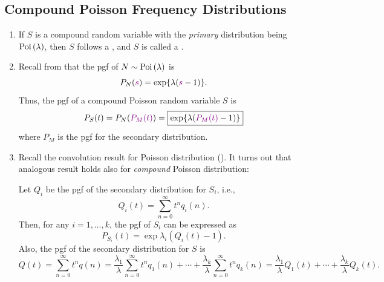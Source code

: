\subsection{Compound Poisson Frequency Distributions}
\begin{enumerate}
\item If \(S\) is a compound random variable with the \emph{primary}
distribution being \(\operatorname{Poi}\left(\lambda\right)\), then \(S\) follows a , and \(S\) is called a .

\item Recall from  that the pgf of
\(N\sim\operatorname{Poi}\left(\lambda\right)\) is
\[
P_N({\color{violet}s})=\exp{\lambda({\color{violet}s}-1)}.
\]
Thus, the pgf of a compound Poisson random variable \(S\) is
\[
P_S(t)=P_N({\color{violet}P_M(t)})=\boxed{\exp{\lambda({\color{violet}P_M(t)}-1)}}
\]
where \(P_M\) is the pgf for the secondary distribution.

\item Recall the convolution result for Poisson distribution
(). It turns out that analogous result holds also
for \emph{compound} Poisson distribution:

\begin{pf}
Let \(Q_i\) be the pgf of the secondary distribution for \(S_i\), i.e.,
\[
Q_i(t)=\sum_{n=0}^{\infty}t^nq_i(n).
\]
Then, for any \(i=1,\dotsc,k\), the pgf of \(S_i\) can be expressed as
\[
P_{S_i}(t)=\exp{\lambda_i(Q_i(t)-1)}.
\]
Also, the pgf of the secondary distribution for \(S\) is
\[
Q(t)=\sum_{n=0}^{\infty}t^nq(n)
=\frac{\lambda_1}{\lambda}\sum_{n=0}^{\infty}t^nq_1(n)
+\dotsb+\frac{\lambda_k}{\lambda}\sum_{n=0}^{\infty}t^nq_k(n)
=\frac{\lambda_1}{\lambda}Q_1(t)+\dotsb+\frac{\lambda_k}{\lambda}Q_k(t).
\]


\end{pf}
\end{enumerate}
